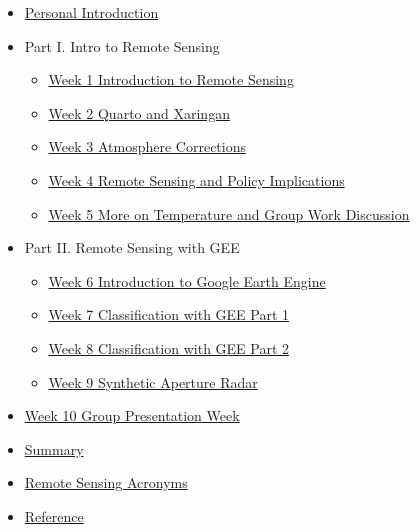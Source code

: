 \documentclass[
  letterpaper,
  DIV=11,
  numbers=noendperiod]{scrreprt}
\providecommand{\tightlist}{%
  \setlength{\itemsep}{0pt}\setlength{\parskip}{0pt}}\usepackage{longtable,booktabs,array}
\begin{document}
\begin{itemize}
\tightlist
\item
  \protect\hyperlink{personal-introduction}{Personal Introduction}
\item
  Part I. Intro to Remote Sensing

  \begin{itemize}
  \tightlist
  \item
    \protect\hyperlink{week-1-introduction-to-remote-sensing}{Week 1
    Introduction to Remote Sensing}
  \item
    \protect\hyperlink{week-2-quarto-and-xaringan}{Week 2 Quarto and
    Xaringan}
  \item
    \protect\hyperlink{week-3-atmosphere-corrections}{Week 3 Atmosphere
    Corrections}
  \item
    \protect\hyperlink{week-4-remote-sensing-and-policy-implications}{Week
    4 Remote Sensing and Policy Implications}
  \item
    \protect\hyperlink{week-5-more-on-temperature-and-group-work-discussion}{Week
    5 More on Temperature and Group Work Discussion}
  \end{itemize}
\item
  Part II. Remote Sensing with GEE

  \begin{itemize}
  \tightlist
  \item
    \protect\hyperlink{week-6-introduction-to-google-earth-engine}{Week
    6 Introduction to Google Earth Engine}
  \item
    \protect\hyperlink{week-7-classification-with-google-earth-engine-i}{Week
    7 Classification with GEE Part 1}
  \item
    \protect\hyperlink{week-8-classification-with-google-earth-engine-ii}{Week
    8 Classification with GEE Part 2}
  \item
    \protect\hyperlink{week-9-synthetic-aperture-radar}{Week 9 Synthetic
    Aperture Radar}
  \end{itemize}
\item
  \protect\hyperlink{week-10-group-presentations}{Week 10 Group
  Presentation Week}
\item
  \protect\hyperlink{remote-sensing-term-recap}{Summary}
\item
  \protect\hyperlink{acronyms-and-key-concepts-in-remote-sensing}{Remote
  Sensing Acronyms}
\item
  \protect\hyperlink{references}{Reference}
\end{itemize}
\end{document}
